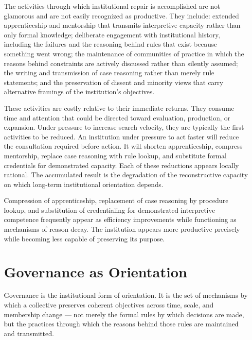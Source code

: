 The activities through which institutional repair is accomplished are not
glamorous and are not easily recognized as productive. They include: extended
apprenticeship and mentorship that transmits interpretive capacity rather than
only formal knowledge; deliberate engagement with institutional history,
including the failures and the reasoning behind rules that exist because
something went wrong; the maintenance of communities of practice in which
the reasons behind constraints are actively discussed rather than silently
assumed; the writing and transmission of case reasoning rather than merely
rule statements; and the preservation of dissent and minority views that
carry alternative framings of the institution's objectives.

These activities are costly relative to their immediate returns. They consume
time and attention that could be directed toward evaluation, production, or
expansion. Under pressure to increase search velocity, they are typically
the first activities to be reduced. An institution under pressure to act
faster will reduce the consultation required before action. It will shorten
apprenticeship, compress mentorship, replace case reasoning with rule lookup,
and substitute formal credentials for demonstrated capacity. Each of these
reductions appears locally rational. The accumulated result is the degradation
of the reconstructive capacity on which long-term institutional orientation
depends.

\begin{observation}
Compression of apprenticeship, replacement of case reasoning by procedure
lookup, and substitution of credentialing for demonstrated interpretive
competence frequently appear as efficiency improvements while functioning
as mechanisms of reason decay. The institution appears more productive
precisely while becoming less capable of preserving its purpose.
\end{observation}

\section{Governance as Orientation}

Governance is the institutional form of orientation. It is the set of
mechanisms by which a collective preserves coherent objectives across time,
scale, and membership change --- not merely the formal rules by which decisions
are made, but the practices through which the reasons behind those rules
are maintained and transmitted.

